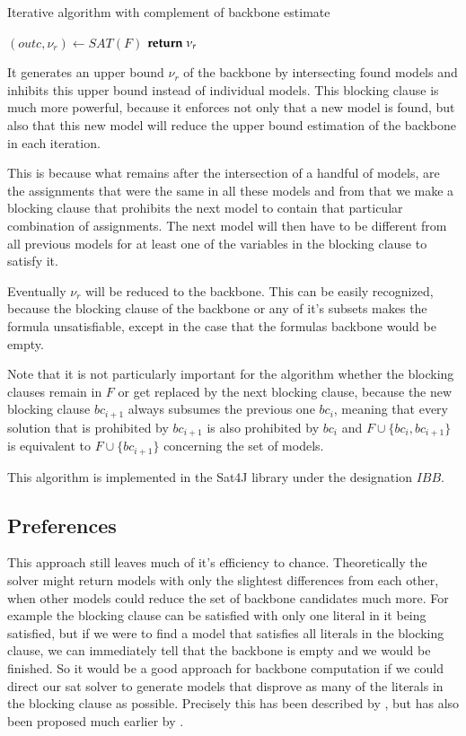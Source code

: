 \begin{algorithm}
\caption{{\sc Iterative algorithm with complement of backbone estimate}}
\DontPrintSemicolon
{}
$(outc,\nu_r) \gets SAT(F)$\;
$\Return \; \nu_r$\;
\end{algorithm}

It generates an upper bound $\nu_r$ of the backbone by intersecting found models and inhibits this upper bound instead of individual models. This blocking clause is much more powerful, because it enforces not only that a new model is found, but also that this new model will reduce the upper bound estimation of the backbone in each iteration. 

This is because what remains after the intersection of a handful of models, are the assignments that were the same in all these models and from that we make a blocking clause that prohibits the next model to contain that particular combination of assignments. The next model will then have to be different from all previous models for at least one of the variables in the blocking clause to satisfy it.

Eventually $\nu_r$ will be reduced to the backbone. This can be easily recognized, because the blocking clause of the backbone or any of it's subsets makes the formula unsatisfiable, except in the case that the formulas backbone would be empty. 

Note that it is not particularly important for the algorithm whether the blocking clauses remain in $F$ or get replaced by the next blocking clause, because the new blocking clause $bc_{i+1}$ always subsumes the previous one $bc_i$, meaning that every solution that is prohibited by $bc_{i+1}$ is also prohibited by $bc_i$ and $F \cup \{bc_i , bc_{i+1}\}$ is equivalent to $F \cup \{bc_{i+1}\}$ concerning the set of models.

This algorithm is implemented in the Sat4J library under the designation $IBB$. 

\subsection{Preferences}

This approach still leaves much of it's efficiency to chance. Theoretically the solver might return models with only the slightest differences from each other, when other models could reduce the set of backbone candidates much more. For example the blocking clause can be satisfied with only one literal in it being satisfied, but if we were to find a model that satisfies all literals in the blocking clause, we can immediately tell that the backbone is empty and we would be finished. So it would be a good approach for backbone computation if we could direct our sat solver to generate models that disprove as many of the literals in the blocking clause as possible. Precisely this has been described by \cite{PJ18}, but has also been proposed much earlier by \cite{kk01}. 

